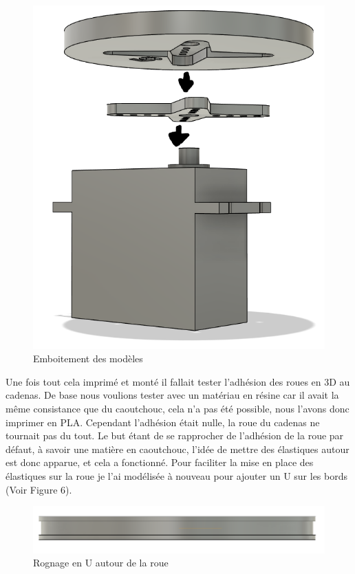\documentclass[twoside]{article}
\begin{document}
\begin{multicols}{2}
\begin{figure}[H]
\centering
\includegraphics[scale=0.4]{wheelquadservo.png}
\caption{Emboitement des modèles}
\end{figure}

Une fois tout cela imprimé et monté il fallait tester l'adhésion des roues en 3D au cadenas. De base nous voulions tester avec un matériau en résine car il avait la même consistance que du caoutchouc, cela n'a pas été possible, nous l'avons donc imprimer en PLA. Cependant l'adhésion était nulle, la roue du cadenas ne tournait pas du tout. Le but étant de se rapprocher de l'adhésion de la roue par défaut, à savoir une matière en caoutchouc, l'idée de mettre des élastiques autour est donc apparue, et cela a fonctionné.
Pour faciliter la mise en place des élastiques sur la roue je l'ai modélisée à nouveau pour ajouter un U sur les bords (Voir Figure 6).

\begin{figure}[H]
\centering
\includegraphics[scale=0.32]{wheelsU.png}
\caption{Rognage en U autour de la roue}
\end{figure}


\end{multicols}
\end{document}
